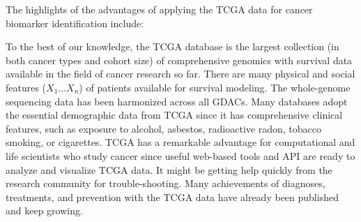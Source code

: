 \documentclass[jpm,article,submit,moreauthors,pdftex]{Definitions/mdpi}
\begin{document}

The highlights of the advantages of applying the TCGA data for cancer biomarker identification include:
\begin{outline}
\1  To the best of our knowledge, the TCGA database is the largest collection (in both cancer types and cohort size) of comprehensive genomics with survival data available in the field of cancer research so far.  
There are many physical and social features ($X_1 ... X_n$) of patients available for survival modeling.
The whole-genome sequencing data has been harmonized across all GDACs.  Many databases adopt the essential demographic data from TCGA since it has comprehensive clinical features, such as exposure to alcohol, asbestos, radioactive radon, tobacco smoking, or cigarettes.
\1  TCGA has a remarkable advantage for computational and life scientists who study cancer since useful web-based tools and API are ready to analyze and visualize TCGA data. It might be getting help quickly from the research community for trouble-shooting.
\1  Many achievements of diagnoses, treatments, and prevention with the TCGA data have already been published and keep growing\cite{Tomczak2015}.\\[0.5cm]
\end{outline}
\end{document}
